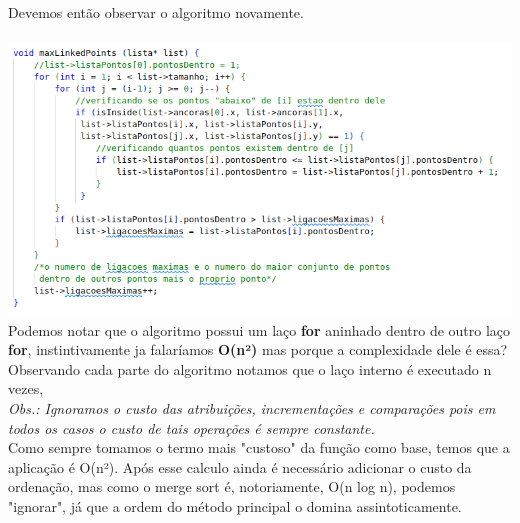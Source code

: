 \documentclass[12pt]{article}
\begin{document}
        Devemos então observar o algoritmo novamente.\\\\
        \includegraphics[width=1.0\linewidth]{Figuras/2.png}\\
        Podemos notar que o algoritmo possui um laço \textbf{for} aninhado dentro de outro laço 
        \textbf{for}, instintivamente ja falaríamos \textbf{O(n²)} mas porque a complexidade dele é
        essa? %
        Observando cada parte do algoritmo notamos que o laço interno é executado n vezes, \\  
        
        \textit{Obs.: Ignoramos o custo das atribuições, incrementações e comparações pois em todos 
        os casos o custo de tais operações é sempre constante.}\\
        
        Como sempre tomamos o termo mais "custoso" da função como base, temos que a aplicação é O(n²). 
        Após esse calculo ainda é necessário adicionar o custo da ordenação, mas como o merge sort é, 
        notoriamente, O(n log n), podemos "ignorar", já que a ordem do método principal o domina assintoticamente.

        


    \newpage
\end{document}
